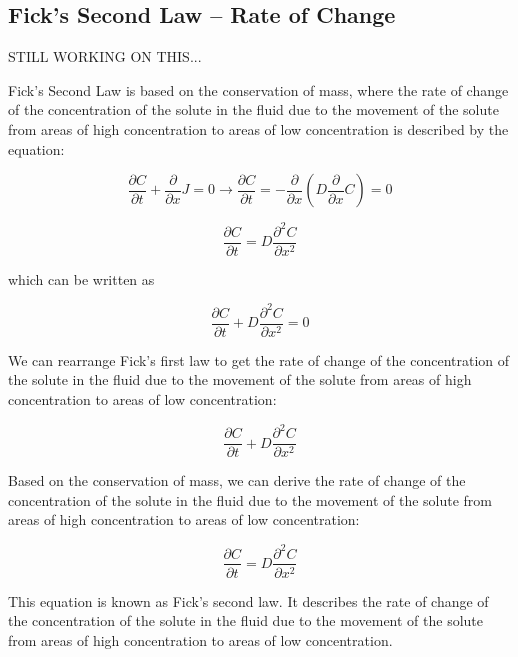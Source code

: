 \documentclass{tufte-handout}\usepackage[]{graphicx}\usepackage[]{xcolor}
\begin{document}
\subsection{Fick's Second Law -- Rate of Change}

STILL WORKING ON THIS... 

Fick's Second Law is based on the conservation of mass, where the rate of change of the concentration of the solute in the fluid due to the movement of the solute from areas of high concentration to areas of low concentration is described by the equation:

\begin{equation}
  \frac{\partial C}{\partial t} + \frac{\partial}{\partial x} J = 0 \rightarrow  \frac{\partial C}{\partial t} = - \frac{\partial}{\partial x}( D \frac{\partial}{\partial x} C) = 0
\end{equation}

\begin{equation}
  \frac{\partial C}{\partial t} = D \frac{\partial^2 C}{\partial x^2}
\end{equation}

which can be written as 

\begin{equation}
  \frac{\partial C}{\partial t} + D \frac{\partial^2 C}{\partial x^2} = 0
\end{equation}



We can rearrange Fick's first law to get the rate of change of the concentration of the solute in the fluid due to the movement of the solute from areas of high concentration to areas of low concentration:

\begin{equation}
  \frac{\partial C}{\partial t} + D \frac{\partial^2 C}{\partial x^2}
\end{equation}


Based on the conservation of mass, we can derive the rate of change of the concentration of the solute in the fluid due to the movement of the solute from areas of high concentration to areas of low concentration:


\begin{equation}
  \frac{\partial C}{\partial t} = D \frac{\partial^2 C}{\partial x^2}
\end{equation}

This equation is known as Fick's second law. It describes the rate of change of the concentration of the solute in the fluid due to the movement of the solute from areas of high concentration to areas of low concentration.
\end{document}
